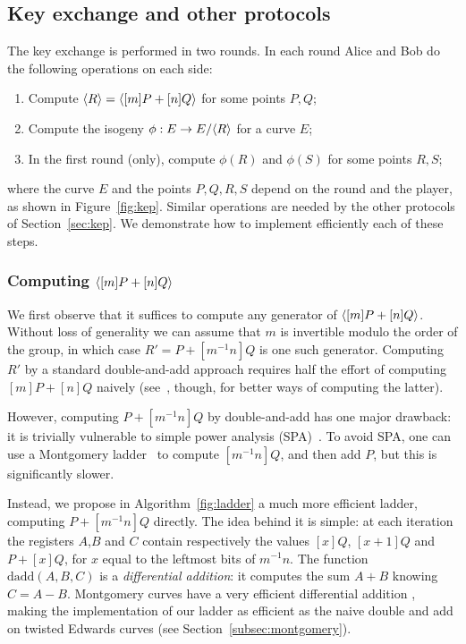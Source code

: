 \subsection{Key exchange and other protocols}\label{subsec:kea}

The key exchange is performed in two rounds. In each round Alice and
Bob do the following operations on each side:
\begin{enumerate}
\item\label{step:muladd} Compute ${\langle R \rangle}={\langle [m]P+[n]Q \rangle}$ for some points $P,Q$;
\item\label{step:isogeny} Compute the isogeny $\phi:E\to E/{\langle R \rangle}$ for a curve $E$;
\item\label{step:push} In the first round (only), compute $\phi(R)$
  and $\phi(S)$ for some points $R,S$;
\end{enumerate}
where the curve $E$ and the points $P,Q,R,S$ depend on the round and
the player, as shown in Figure~\ref{fig:kep}. Similar operations are
needed by the other protocols of Section~\ref{sec:kep}. We demonstrate
how to implement efficiently each of these steps.

\subsubsection{Computing ${\langle [m]P+[n]Q \rangle}$}\label{sssec:muladd}

We first observe that it suffices to compute any generator of
${\langle [m]P+[n]Q \rangle}$. Without loss of generality we can assume that $m$
is invertible modulo the order of the group, in which case $R' = P +
[m^{-1}n]Q$ is one such generator. Computing $R'$ by a standard
double-and-add approach requires half the effort of computing
$[m]P+[n]Q$ naively
(see~\cite{elgamal,solinas01,antipa+brown+gallant+lambert+struik+vanstone06},
though, for better ways of computing the latter).

However, computing $P+[m^{-1}n]Q$ by double-and-add has one major
drawback: it is trivially vulnerable to simple power analysis
(SPA)~\cite{kocher+jaffe+jun99}. To avoid SPA, one can use a Montgomery
ladder~\cite{montgomery} to compute $[m^{-1}n]Q$, and then add $P$, but
this is significantly slower.

Instead, we propose in Algorithm~\ref{fig:ladder} a much more efficient ladder,
computing $P+[m^{-1}n]Q$ directly. The idea behind it is simple: at
each iteration the registers $A$,$B$ and $C$ contain respectively the
values $[x]Q$, $[x+1]Q$ and $P+[x]Q$, for $x$ equal to the leftmost
bits of $m^{-1}n$. The function $\mathrm{dadd}(A,B,C)$ is a
\emph{differential addition}: it computes the sum $A+B$ knowing
$C=A-B$. Montgomery curves have a very efficient differential addition
\cite{montgomery}, making the implementation of our ladder as
efficient as the naive double and add on twisted Edwards curves (see
Section~\ref{subsec:montgomery}).

